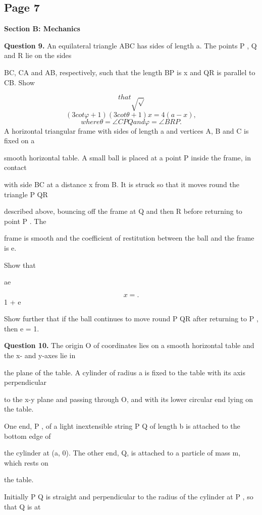 \documentclass[12pt]{article}
\begin{document}
\subsection*{Page 7}
\begin{flushleft}
\bigskip\textbf{Section B: Mechanics}\par
\bigskip\textbf{Question 9.} An equilateral triangle ABC has sides of length a. The points P , Q and R lie on the sides\par
BC, CA and AB, respectively, such that the length BP is x and QR is parallel to CB. Show\par
\[that \sqrt \sqrt\]
\[( 3 cot φ + 1)( 3 cot θ + 1)x = 4(a - x) ,\]
\[where θ = ∠CP Q and φ = ∠BRP .\]
A horizontal triangular frame with sides of length a and vertices A, B and C is fixed on a\par
smooth horizontal table. A small ball is placed at a point P inside the frame, in contact\par
with side BC at a distance x from B. It is struck so that it moves round the triangle P QR\par
described above, bouncing off the frame at Q and then R before returning to point P . The\par
frame is smooth and the coefficient of restitution between the ball and the frame is e.\par
Show that\par
ae\par
\[x = .\]
1 + e\par
Show further that if the ball continues to move round P QR after returning to P , then e = 1.\par
\bigskip\textbf{Question 10.} The origin O of coordinates lies on a smooth horizontal table and the x- and y-axes lie in\par
the plane of the table. A cylinder of radius a is fixed to the table with its axis perpendicular\par
to the x-y plane and passing through O, and with its lower circular end lying on the table.\par
One end, P , of a light inextensible string P Q of length b is attached to the bottom edge of\par
the cylinder at (a, 0). The other end, Q, is attached to a particle of mass m, which rests on\par
the table.\par
Initially P Q is straight and perpendicular to the radius of the cylinder at P , so that Q is at\par

\end{flushleft}
\end{document}
